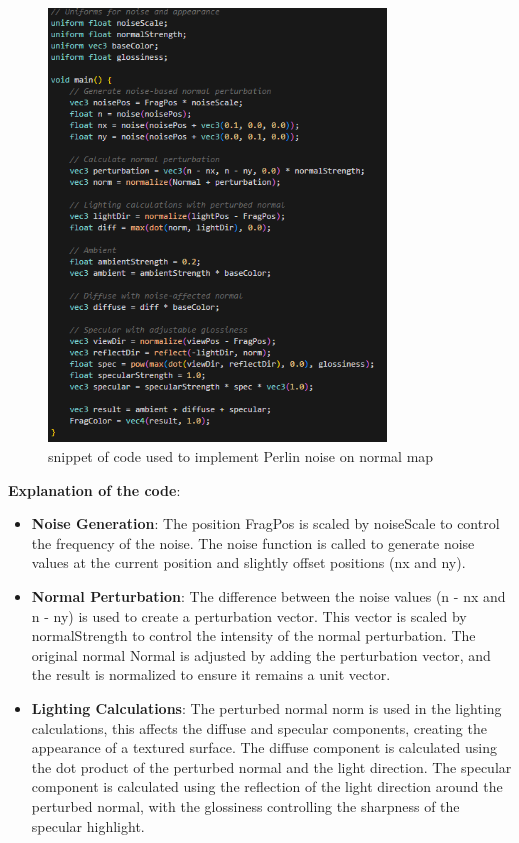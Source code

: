 \documentclass[12pt]{article}
\begin{document}
\begin{enumerate}
    \begin{figure}[H]
        \centering
        \includegraphics[width=0.8\textwidth]{Images/sphere3code.png}
        \caption{snippet of code used to implement Perlin noise on normal map}
    \end{figure}

    \textbf{Explanation of the code}:
    \begin {itemize}
        \item \textbf{Noise Generation}:
        \newline
        The position FragPos is scaled by noiseScale to control the frequency of the noise. The noise function is called to generate noise values at the current position and slightly offset positions (nx and ny).

        \item \textbf{Normal Perturbation}:
        \newline
        The difference between the noise values (n - nx and n - ny) is used to create a perturbation vector. This vector is scaled by normalStrength to control the intensity of the normal perturbation.
        The original normal Normal is adjusted by adding the perturbation vector, and the result is normalized to ensure it remains a unit vector.

        \item \textbf{Lighting Calculations}:
        \newline
        The perturbed normal norm is used in the lighting calculations, this affects the diffuse and specular components, creating the appearance of a textured surface.
        The diffuse component is calculated using the dot product of the perturbed normal and the light direction.
        The specular component is calculated using the reflection of the light direction around the perturbed normal, with the glossiness controlling the sharpness of the specular highlight.
    \end{itemize}
    

\end{enumerate}
\end{document}
